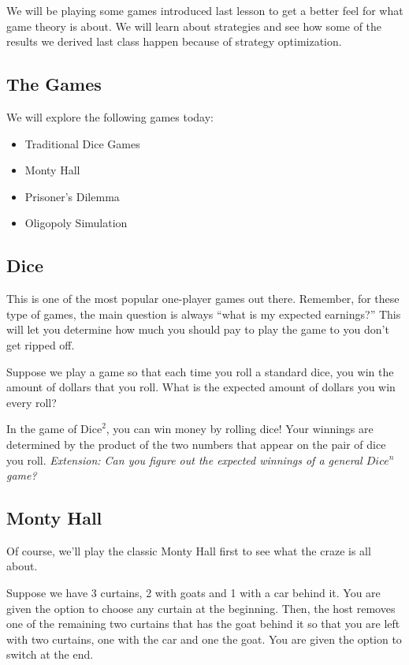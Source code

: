 We will be playing some games introduced last lesson to get a better feel for what game theory is about. We will learn about strategies and see how some of the results we derived last class happen because of strategy optimization.

\subsection{The Games}
We will explore the following games today:
\begin{itemize}
    \item Traditional Dice Games
    \item Monty Hall
    \item Prisoner's Dilemma
    \item Oligopoly Simulation
\end{itemize}

\subsection{Dice}
This is one of the most popular one-player games out there. Remember, for these type of games, the main question is always ``what is my expected earnings?'' This will let you determine how much you should pay to play the game to you don't get ripped off.

\begin{gm}
Suppose we play a game so that each time you roll a standard dice, you win the amount of dollars that you roll. What is the expected amount of dollars you win every roll?
\end{gm}

\begin{gm}
In the game of $\text{Dice}^2$, you can win money by rolling dice! Your winnings are determined by the product of the two numbers that appear on the pair of dice you roll. \textit{Extension: Can you figure out the expected winnings of a general $Dice^n$ game?}
\end{gm}

\subsection{Monty Hall}
Of course, we'll play the classic Monty Hall first to see what the craze is all about.

\begin{gm}
Suppose we have 3 curtains, 2 with goats and 1 with a car behind it. You are given the option to choose any curtain at the beginning. Then, the host removes one of the remaining two curtains that has the goat behind it so that you are left with two curtains, one with the car and one the goat. You are given the option to switch at the end.
\end{gm}

